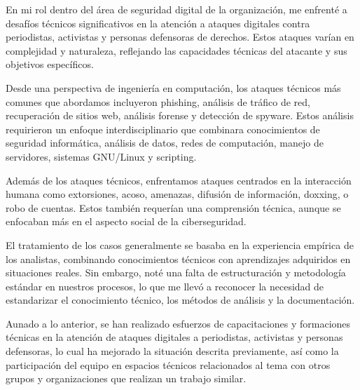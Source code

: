 \documentclass[12pt]{caltech_thesis}
\begin{document}
En mi rol dentro del área de seguridad digital de la organización, me enfrenté a desafíos técnicos significativos en la atención a ataques digitales contra periodistas, activistas y personas defensoras de derechos. Estos ataques varían en complejidad y naturaleza, reflejando las capacidades técnicas del atacante y sus objetivos específicos.

Desde una perspectiva de ingeniería en computación, los ataques técnicos más comunes que abordamos incluyeron phishing, análisis de tráfico de red, recuperación de sitios web, análisis forense y detección de spyware. Estos análisis requirieron un enfoque interdisciplinario que combinara conocimientos de seguridad informática, análisis de datos, redes de computación, manejo de servidores, sistemas GNU/Linux y scripting.

Además de los ataques técnicos, enfrentamos ataques centrados en la interacción humana como extorsiones, acoso, amenazas, difusión de información, doxxing, o robo de cuentas. Estos también requerían una comprensión técnica, aunque se enfocaban más en el aspecto social de la ciberseguridad.

El tratamiento de los casos generalmente se basaba en la experiencia empírica de los analistas, combinando conocimientos técnicos con aprendizajes adquiridos en situaciones reales. Sin embargo, noté una falta de estructuración y metodología estándar en nuestros procesos, lo que me llevó a reconocer la necesidad de estandarizar el conocimiento técnico, los métodos de análisis y la documentación.

Aunado a lo anterior, se han realizado esfuerzos de capacitaciones y formaciones técnicas en la atención de ataques digitales a periodistas, activistas y personas defensoras, lo cual ha mejorado la situación descrita previamente, así como la participación del equipo en espacios técnicos relacionados al tema con otros grupos y organizaciones que realizan un trabajo similar.



\end{document}
